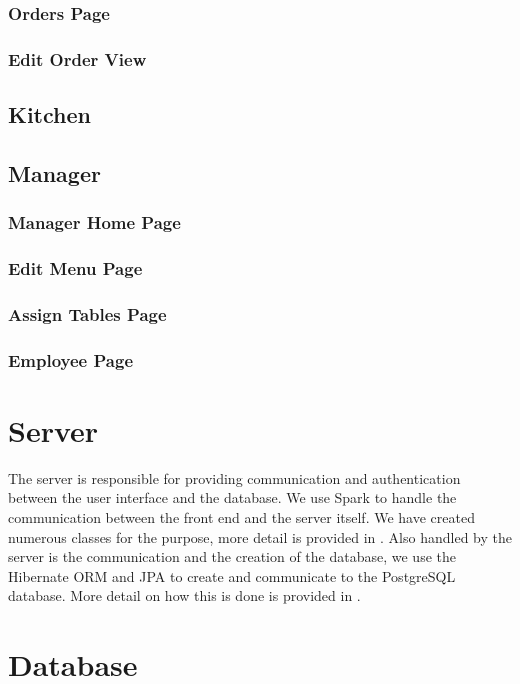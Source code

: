 \documentclass[12pt, twoside, a4paper]{report}
\begin{document}
\subsubsection*{Orders Page}

\subsubsection*{Edit Order View}

\subsection*{Kitchen}

\subsection*{Manager}
\subsubsection*{Manager Home Page}

\subsubsection*{Edit Menu Page}

\subsubsection*{Assign Tables Page}

\subsubsection*{Employee Page}

\section*{Server}
The server is responsible for providing communication and authentication between the user interface and the database.
We use Spark to handle the communication between the front end and the server itself. We have created numerous classes for the purpose, more detail is provided in \textit{}.
Also handled by the server is the communication and the creation of the database, we use the Hibernate ORM and JPA to create and communicate to the PostgreSQL database. More detail on how this is done is provided in \textit{}.

\section*{Database}
\end{document}
